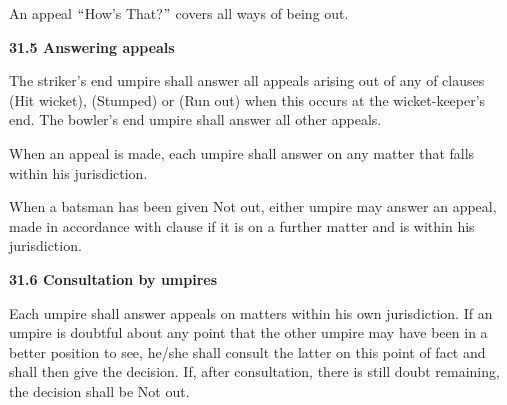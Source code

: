\documentclass[12pt]{article}
\begin{document}
\vspace{\baselineskip}
{\fontsize{9pt}{10.8pt}\selectfont An appeal $``$How’s That?$"$  covers all ways of being out.\par}\par


\vspace{\baselineskip}
{\fontsize{11pt}{13.2pt}\selectfont \textbf{31.5 \tabto{0.47in} Answering appeals}\par}\par


\vspace{\baselineskip}
\begin{adjustwidth}{0.0in}{0.24in}
{\fontsize{9pt}{10.8pt}\selectfont The striker’s end umpire shall answer all appeals arising out of any of clauses (Hit wicket), (Stumped) or  (Run out) when this occurs at the wicket-keeper’s end. The bowler’s end umpire shall answer all other appeals.\par}\par

\end{adjustwidth}


\vspace{\baselineskip}
{\fontsize{9pt}{10.8pt}\selectfont When an appeal is made, each umpire shall answer on any matter that falls within his jurisdiction.\par}\par


\vspace{\baselineskip}
\begin{adjustwidth}{0.0in}{0.29in}
{\fontsize{9pt}{10.8pt}\selectfont When a batsman has been given Not out, either umpire may answer an appeal, made in accordance with clause if it is on a further matter and is within his jurisdiction.\par}\par

\end{adjustwidth}


\vspace{\baselineskip}
{\fontsize{11pt}{13.2pt}\selectfont \textbf{31.6 \tabto{0.47in} Consultation by umpires}\par}\par


\vspace{\baselineskip}
\begin{adjustwidth}{0.0in}{0.07in}
{\fontsize{9pt}{10.8pt}\selectfont Each umpire shall answer appeals on matters within his own jurisdiction. If an umpire is doubtful about any point that the other umpire may have been in a better position to see, he/she shall consult the latter on this point of fact and shall then give the decision. If, after consultation, there is still doubt remaining, the decision shall be Not out.\par}\par

\end{adjustwidth}
\end{document}
